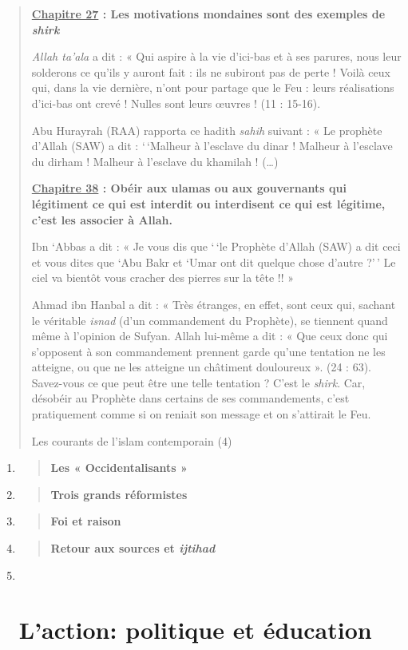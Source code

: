 \begin{quote}
\textbf{\underline{Chapitre 27} : Les motivations mondaines sont des
exemples de \emph{shirk}}

\emph{Allah ta'ala} a dit : « Qui aspire à la vie d'ici-bas et à ses
parures, nous leur solderons ce qu'ils y auront fait : ils ne subiront
pas de perte ! Voilà ceux qui, dans la vie dernière, n'ont pour partage
que le Feu : leurs réalisations d'ici-bas ont crevé ! Nulles sont leurs
œuvres ! (11 : 15-16).

Abu Hurayrah (RAA) rapporta ce hadith \emph{sahih} suivant : « Le
prophète d'Allah (SAW) a dit : `\,`Malheur à l'esclave du dinar !
Malheur à l'esclave du dirham ! Malheur à l'esclave du khamilah !
(\ldots)

\textbf{\underline{Chapitre 38} : Obéir aux ulamas ou aux gouvernants
qui légitiment ce qui est interdit ou interdisent ce qui est légitime,
c'est les associer à Allah.}

Ibn `Abbas a dit : « Je vous dis que `\,`le Prophète d'Allah (SAW) a dit
ceci et vous dites que `Abu Bakr et `Umar ont dit quelque chose d'autre
?'\,' Le ciel va bientôt vous cracher des pierres sur la tête !! »

Ahmad ibn Hanbal a dit : « Très étranges, en effet, sont ceux qui,
sachant le véritable \emph{isnad} (d'un commandement du Prophète), se
tiennent quand même à l'opinion de Sufyan. Allah lui-même a dit : « Que
ceux donc qui s'opposent à son commandement prennent garde qu'une
tentation ne les atteigne, ou que ne les atteigne un châtiment
douloureux ». (24 : 63). Savez-vous ce que peut être une telle tentation
? C'est le \emph{shirk}. Car, désobéir au Prophète dans certains de ses
commandements, c'est pratiquement comme si on reniait son message et on
s'attirait le Feu.

Les courants de l'islam contemporain (4)
\end{quote}

\begin{enumerate}
\def\labelenumi{\Roman{enumi}.}
\item
  \begin{quote}
  \textbf{Les « Occidentalisants »}
  \end{quote}
\item
  \begin{quote}
  \textbf{Trois grands réformistes}
  \end{quote}
\item
  \begin{quote}
  \textbf{Foi et raison}
  \end{quote}
\item
  \begin{quote}
  \textbf{Retour aux sources et \emph{ijtihad}}
  \end{quote}
\item ~
  \hypertarget{laction-politique-et-uxe9ducation}{%
  \section{L'action: politique et
  éducation}\label{laction-politique-et-uxe9ducation}}
\end{enumerate}

